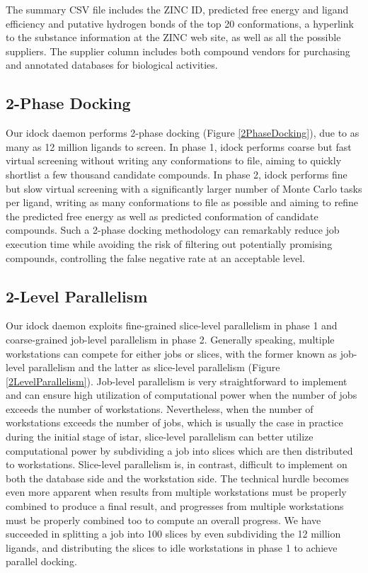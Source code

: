 \documentclass[12pt]{article}
\begin{document}
The summary CSV file includes the ZINC ID, predicted free energy and ligand efficiency and putative hydrogen bonds of the top 20 conformations, a hyperlink to the substance information at the ZINC web site, as well as all the possible suppliers. The supplier column includes both compound vendors for purchasing and annotated databases for biological activities.

\subsection*{\sffamily \large 2-Phase Docking}

Our idock daemon performs 2-phase docking (Figure \ref{2PhaseDocking}), due to as many as 12 million ligands to screen. In phase 1, idock performs coarse but fast virtual screening without writing any conformations to file, aiming to quickly shortlist a few thousand candidate compounds. In phase 2, idock performs fine but slow virtual screening with a significantly larger number of Monte Carlo tasks per ligand, writing as many conformations to file as possible and aiming to refine the predicted free energy as well as predicted conformation of candidate compounds. Such a 2-phase docking methodology can remarkably reduce job execution time while avoiding the risk of filtering out potentially promising compounds, controlling the false negative rate at an acceptable level.

\subsection*{\sffamily \large 2-Level Parallelism}

Our idock daemon exploits fine-grained slice-level parallelism in phase 1 and coarse-grained job-level parallelism in phase 2. Generally speaking, multiple workstations can compete for either jobs or slices, with the former known as job-level parallelism and the latter as slice-level parallelism (Figure \ref{2LevelParallelism}). Job-level parallelism is very straightforward to implement and can ensure high utilization of computational power when the number of jobs exceeds the number of workstations. Nevertheless, when the number of workstations exceeds the number of jobs, which is usually the case in practice during the initial stage of istar, slice-level parallelism can better utilize computational power by subdividing a job into slices which are then distributed to workstations. Slice-level parallelism is, in contrast, difficult to implement on both the database side and the workstation side. The technical hurdle becomes even more apparent when results from multiple workstations must be properly combined to produce a final result, and progresses from multiple workstations must be properly combined too to compute an overall progress. We have succeeded in splitting a job into 100 slices by even subdividing the 12 million ligands, and distributing the slices to idle workstations in phase 1 to achieve parallel docking.
\end{document}
